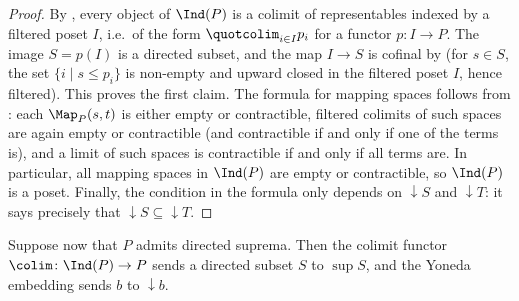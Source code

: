 	\begin{proof}
		By , every object of $\Ind(P)$ is a colimit of representables indexed by a filtered poset $I$, i.e.\ of the form $\quotcolim_{i \in I} p_i$ for a functor $p\colon I \to P$. The image $S = p(I)$ is a directed subset, and the map $I \to S$ is cofinal by  (for $s \in S$, the set $\{i \mid s \leq p_i\}$ is non-empty and upward closed in the filtered poset $I$, hence filtered). This proves the first claim. The formula for mapping spaces follows from : each $\Map_P(s,t)$ is either empty or contractible, filtered colimits of such spaces are again empty or contractible (and contractible if and only if one of the terms is), and a limit of such spaces is contractible if and only if all terms are. In particular, all mapping spaces in $\Ind(P)$ are empty or contractible, so $\Ind(P)$ is a poset. Finally, the condition in the formula only depends on ${\downarrow}S$ and ${\downarrow}T$: it says precisely that ${\downarrow}S \subseteq {\downarrow}T$.
	\end{proof}

	Suppose now that $P$ admits directed suprema. Then the colimit functor $\colim\colon \Ind(P) \to P$ sends a directed subset $S$ to $\sup S$, and the Yoneda embedding sends $b$ to ${\downarrow}b$.

